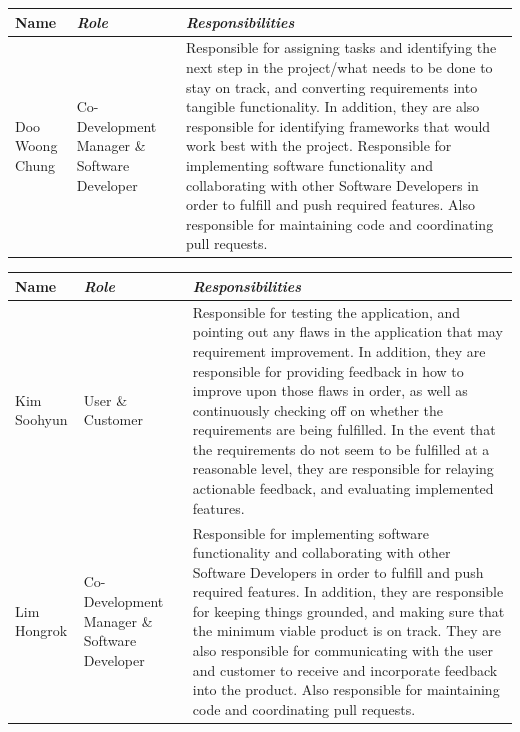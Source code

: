 \documentclass[conference]{IEEEtran}
\begin{document}
\begin{table}[htbp!]\normalsize
\begin{center}
\begin{tabular}{|p{1.5cm}|p{1.7cm}|p{4.5cm}|}
\hline
\textbf{Name} & \textbf{\textit{Role}}& \textbf{\textit{Responsibilities}}\\
\hline
Doo Woong Chung & Co-Development Manager \& Software Developer &
Responsible for assigning tasks and identifying the next step in the project/what needs to be done to stay on track, and converting requirements into tangible functionality. In addition, they are also responsible for identifying frameworks that would work best with the project.\newline
\newline Responsible for implementing software functionality and collaborating with other Software Developers in order to fulfill and push required features. Also responsible for maintaining code and coordinating pull requests.
\\ \hline
\end{tabular}
\label{tab1}
\end{center}
\end{table}
\newpage

\begin{table}[htbp!]\normalsize
\begin{center}
\begin{tabular}{|p{1.5cm}|p{1.7cm}|p{4.5cm}|}
\hline
\textbf{Name} & \textbf{\textit{Role}}& \textbf{\textit{Responsibilities}}\\
\hline
Kim Soohyun & User \& Customer &
Responsible for testing the application, and pointing out any flaws in the application that may requirement improvement.\newline
\newline In addition, they are responsible for providing feedback in how to improve upon those flaws in order, as well as continuously checking off on whether the requirements are being fulfilled. 
\newline In the event that the requirements do not seem to be fulfilled at a reasonable level, they are responsible for relaying actionable feedback, and evaluating implemented features.
\\ \hline
Lim Hongrok & Co-Development Manager \& Software Developer &
Responsible for implementing software functionality and collaborating with other Software Developers in order to fulfill and push required features.\newline
\newline In addition, they are responsible for keeping things grounded, and making sure that the minimum viable product is on track. 
\newline They are also responsible for communicating with the user and customer to receive and incorporate feedback into the product. Also responsible for maintaining code and coordinating pull requests.
\\ \hline
\end{tabular}
\label{tab1}
\end{center}
\end{table}
\end{document}
